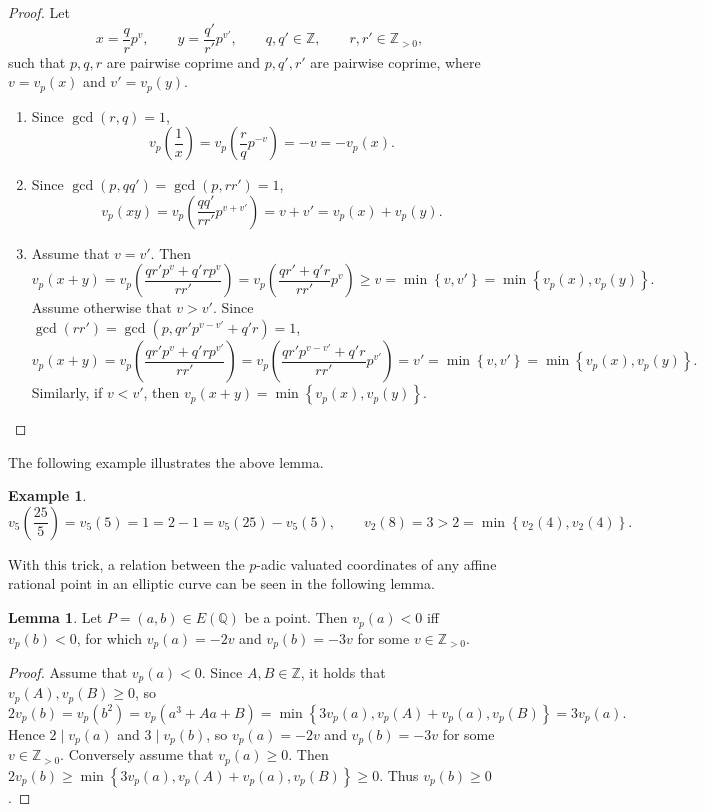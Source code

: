 \documentclass{article}
\newcommand{\Z}{\mathbb{Z}}
\newcommand{\Q}{\mathbb{Q}}
\newcommand{\rb}[1]{\left( #1 \right)}
\newcommand{\cb}[1]{\left\{ #1 \right\}}
\theoremstyle{definition}\newtheorem*{definition}{Definition}
\theoremstyle{definition}\newtheorem*{example}{Example}
\theoremstyle{definition}\newtheorem*{remark}{Remark}
\newtheorem{lemma}[proposition]{Lemma}
\begin{document}
\begin{proof}
Let
$$ x = \dfrac{q}{r}p^v, \qquad y = \dfrac{q'}{r'}p^{v'}, \qquad q, q' \in \Z, \qquad r, r' \in \Z_{> 0}, $$
such that $ p, q, r $ are pairwise coprime and $ p, q', r' $ are pairwise coprime, where $ v = v_p\rb{x} $ and $ v' = v_p\rb{y} $.
\begin{enumerate}
\item Since $ \gcd\rb{r, q} = 1 $,
$$ v_p\rb{\dfrac{1}{x}} = v_p\rb{\dfrac{r}{q}p^{-v}} = -v = -v_p\rb{x}. $$
\item Since $ \gcd\rb{p, qq'} = \gcd\rb{p, rr'} = 1 $,
$$ v_p\rb{xy} = v_p\rb{\dfrac{qq'}{rr'}p^{v + v'}} = v + v' = v_p\rb{x} + v_p\rb{y}. $$
\item Assume that $ v = v' $. Then
$$ v_p\rb{x + y} = v_p\rb{\dfrac{qr'p^v + q'rp^v}{rr'}} = v_p\rb{\dfrac{qr' + q'r}{rr'}p^v} \ge v = \min\cb{v, v'} = \min\cb{v_p\rb{x}, v_p\rb{y}}. $$
Assume otherwise that $ v > v' $. Since $ \gcd\rb{rr'} = \gcd\rb{p, qr'p^{v - v'} + q'r} = 1 $,
$$ v_p\rb{x + y} = v_p\rb{\dfrac{qr'p^v + q'rp^{v'}}{rr'}} = v_p\rb{\dfrac{qr'p^{v - v'} + q'r}{rr'}p^{v'}} = v' = \min\cb{v, v'} = \min\cb{v_p\rb{x}, v_p\rb{y}}. $$
Similarly, if $ v < v' $, then $ v_p\rb{x + y} = \min\cb{v_p\rb{x}, v_p\rb{y}} $.
\end{enumerate}
\end{proof}

The following example illustrates the above lemma.

\begin{example}
$$ v_5\rb{\dfrac{25}{5}} = v_5\rb{5} = 1 = 2 - 1 = v_5\rb{25} - v_5\rb{5}, \qquad v_2\rb{8} = 3 > 2 = \min\cb{v_2\rb{4}, v_2\rb{4}}. $$
\end{example}

With this trick, a relation between the $ p $-adic valuated coordinates of any affine rational point in an elliptic curve can be seen in the following lemma.

\begin{lemma}
Let $ P = \rb{a, b} \in E\rb{\Q} $ be a point. Then $ v_p\rb{a} < 0 $ iff $ v_p\rb{b} < 0 $, for which $ v_p\rb{a} = -2v $ and $ v_p\rb{b} = -3v $ for some $ v \in \Z_{> 0} $.
\end{lemma}

\begin{proof}
Assume that $ v_p\rb{a} < 0 $. Since $ A, B \in \Z $, it holds that $ v_p\rb{A}, v_p\rb{B} \ge 0 $, so
$$ 2v_p\rb{b} = v_p\rb{b^2} = v_p\rb{a^3 + Aa + B} = \min\cb{3v_p\rb{a}, v_p\rb{A} + v_p\rb{a}, v_p\rb{B}} = 3v_p\rb{a}. $$
Hence $ 2 \mid v_p\rb{a} $ and $ 3 \mid v_p\rb{b} $, so $ v_p\rb{a} = -2v $ and $ v_p\rb{b} = -3v $ for some $ v \in \Z_{> 0} $. Conversely assume that $ v_p\rb{a} \ge 0 $. Then $ 2v_p\rb{b} \ge \min\cb{3v_p\rb{a}, v_p\rb{A} + v_p\rb{a}, v_p\rb{B}} \ge 0 $. Thus $ v_p\rb{b} \ge 0 $.
\end{proof}
\end{document}
